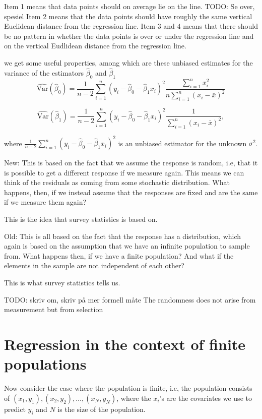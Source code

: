 \documentclass{article}
\begin{document}
Item 1 means that data points should on average lie on the line.
TODO: Se over, spesiel
Item 2 means that the data points should have roughly the same vertical
Euclidean distance from the regression line.
Item 3 and 4 means that there should be no pattern in whether the data points is over
or under the regression line and on the vertical Eudlidean distance from the
regression line.

we get some useful properties, among which are these unbiased estimates for the
variance of the estimators \(\hat{\beta}_0\) and \(\hat{\beta}_1\)
\begin{equation*}
 \widehat{\mathrm{Var}} \left( \hat{\beta}_0 \right) = \frac{1}{n - 2} \sum_{i = 1}^n\left( y_i - \hat{\beta}_0 -
 \hat{\beta}_1 x_i \right)^2 \frac{\sum_{i = 1}^n x_i^2}{n
   \sum_{i = 1}^n \left( x_i - \bar{x} \right)^2}
\end{equation*}
 

\begin{equation*}
 \widehat{\mathrm{Var}} \left( \hat{\beta}_1 \right) = \frac{1}{n - 2} \sum_{i = 1}^n\left( y_i - \hat{\beta}_0 -
 \hat{\beta}_1 x_i \right)^2\frac{1}{
   \sum_{i = 1}^n \left( x_i - \bar{x} \right)^2},
\end{equation*}

where \(\frac{1}{n - 2} \sum_{i = 1}^n\left( y_i - \hat{\beta}_0 -
 \hat{\beta}_1 x_i \right)^2\) is an
unbiased estimator for the unknown \(\sigma^2\).

New: This is based on the fact that we assume the response is random, i.e, that
it is possible to get a different response if we measure again. This means we
can think of the residuals as coming from some stochastic distribution. What
happens, then, if we instead assume that the responses are fixed and are the
same if we measure them again?

This is the idea that survey statistics is based on.

Old: This is all based on the fact that the response has a distribution, which again
is based on the assumption that we have an infinite population to sample from.
What happens then, if we have a finite population? And what if the elements in
the sample are not independent of each other?

This is what survey statistics tells us.

TODO: skriv om, skriv på mer formell måte
The randomness does not arise from measurement but from selection


\section{Regression in the context of finite populations} \label{sec:RegFinPop}
Now consider the case where the population is finite, i.e, the population
consists of \((x_1, y_1),
(x_2, y_2), \dots , (x_N, y_N)\), where the \(x_i\)'s are the covariates we use to
predict \(y_i\) and \(N\) is the size of the population.
\end{document}
